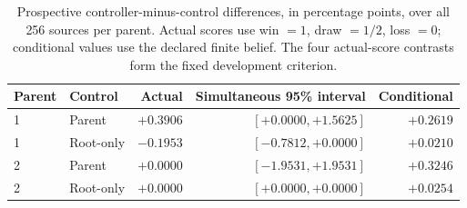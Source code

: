 \begin{table}[ht]
\centering\small
\begin{tabular}{llrrr}
\toprule
Parent & Control & Actual & Simultaneous 95\% interval & Conditional \\
\midrule
1 & Parent & $+0.3906$ & $[+0.0000, +1.5625]$ & $+0.2619$ \\
1 & Root-only & $-0.1953$ & $[-0.7812, +0.0000]$ & $+0.0210$ \\
2 & Parent & $+0.0000$ & $[-1.9531, +1.9531]$ & $+0.3246$ \\
2 & Root-only & $+0.0000$ & $[+0.0000, +0.0000]$ & $+0.0254$ \\
\bottomrule
\end{tabular}
\caption{Prospective controller-minus-control differences, in percentage
points, over all 256 sources per parent. Actual scores use win $=1$,
draw $=1/2$, loss $=0$; conditional values use the declared finite belief.
The four actual-score contrasts form the fixed development criterion.}
\label{tab:prospective-incumbent}
\end{table}
